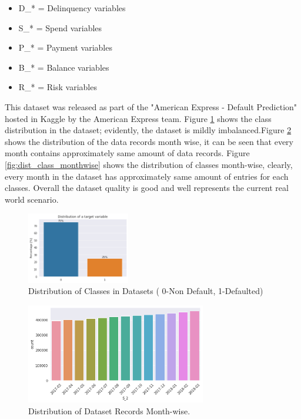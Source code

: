 \documentclass[twoside,11pt,a4paper]{article}
\begin{document}
\begin{itemize}
	\item D\_* = Delinquency variables
	\item S\_* = Spend variables
	\item P\_* = Payment variables
	\item B\_* = Balance variables
	\item R\_* = Risk variables	
\end{itemize}

This dataset\citep{amex-default-prediction-dataset} was released as part of the "American Express - Default Prediction" hosted in Kaggle by the American Express team. Figure \ref{fig:dataset_dist} shows the class distribution in the dataset; evidently, the dataset is mildly imbalanced.Figure \ref{fig:dataset_dist_monthwise} shows the distribution of the data records month wise, it can be seen that every month contains approximately same amount of data records. Figure \ref{fig:dist_class_monthwise} shows the distribution of classes month-wise, clearly, every month in the dataset has approximately same amount of entries for each classes. Overall the dataset quality is good and well represents the current real world scenario.\\

\begin{figure}[ht]
	\centering
	\includegraphics[width=0.4\textwidth]{dataset_dist}
	\caption[Distribution of Classes in Dataset]{Distribution of Classes in Datasets ( 0-Non Default, 1-Defaulted)}
	\label{fig:dataset_dist}
\end{figure}
\FloatBarrier
\begin{figure}[ht]
	\centering
	\includegraphics[width=0.7\textwidth]{dataset_dist_monthwise}
	\caption[Distribution of Dataset Records Month-wise]{Distribution of Dataset Records Month-wise.}
	\label{fig:dataset_dist_monthwise}
\end{figure}
\FloatBarrier
\end{document}
